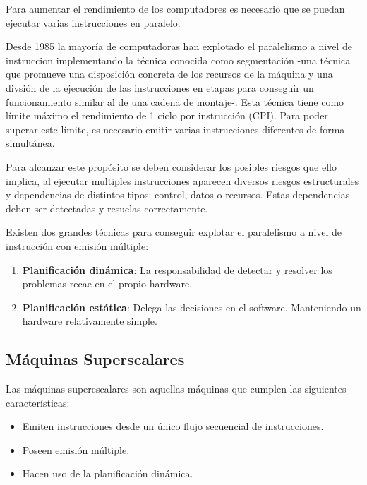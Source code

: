 Para aumentar el rendimiento de los computadores es necesario 
que se puedan ejecutar varias instrucciones en paralelo.

\bigskip
Desde 1985 la mayoría de computadoras han explotado el paralelismo
a nivel de instruccion implementando la técnica conocida como 
segmentación -una técnica que promueve una disposición concreta 
de los recursos de la máquina y una divsión de la ejecución de 
las instrucciones en etapas para conseguir un funcionamiento 
similar al de una cadena de montaje-. Esta técnica tiene como
límite máximo  el rendimiento de 1 ciclo por instrucción (CPI). 
Para poder superar este límite, es necesario emitir varias 
instrucciones diferentes de forma simultánea.\cite{Hennessy:2011}

\bigskip
Para alcanzar este propósito se deben considerar los posibles
riesgos que ello implica, al ejecutar multiples instrucciones
aparecen diversos riesgos estructurales y dependencias de 
distintos tipos: control, datos o recursos. Estas dependencias
 deben ser detectadas y resuelas correctamente.

\bigskip
Existen dos grandes técnicas para conseguir explotar el 
paralelismo a nivel de instrucción con emisión múltiple:

\begin{enumerate}

\item \textbf{Planificación dinámica}: La responsabilidad de
detectar y resolver los problemas recae en el propio hardware.

\item \textbf{Planificación estática}: Delega las decisiones en
 el software. Manteniendo un hardware relativamente simple.

\end{enumerate}

\subsection{Máquinas Superscalares}

Las máquinas superescalares son aquellas máquinas que cumplen 
las siguientes características:

\begin{itemize}

\item Emiten instrucciones desde un único flujo secuencial de 
instrucciones.

\item Poseen emisión múltiple.

\item Hacen uso de la planificación dinámica.

\end{itemize}

